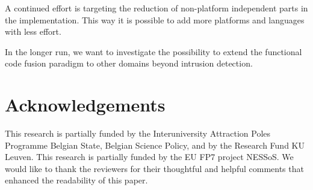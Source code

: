 \documentclass[conference]{IEEEtran}
\begin{document}
A continued effort is targeting the reduction of non-platform independent parts
in the implementation. This way it is possible to add more platforms and
languages with less effort.

In the longer run, we want to investigate the possibility to extend the
functional code fusion paradigm to other domains beyond intrusion detection.

\section{Acknowledgements}

This research is partially funded by the Interuniversity Attraction Poles
Programme Belgian State, Belgian Science Policy, and by the Research Fund KU
Leuven. This research is partially funded by the EU FP7 project NESSoS\@. We
would like to thank the reviewers for their thoughtful and helpful comments
that enhanced the readability of this paper.



\end{document}

